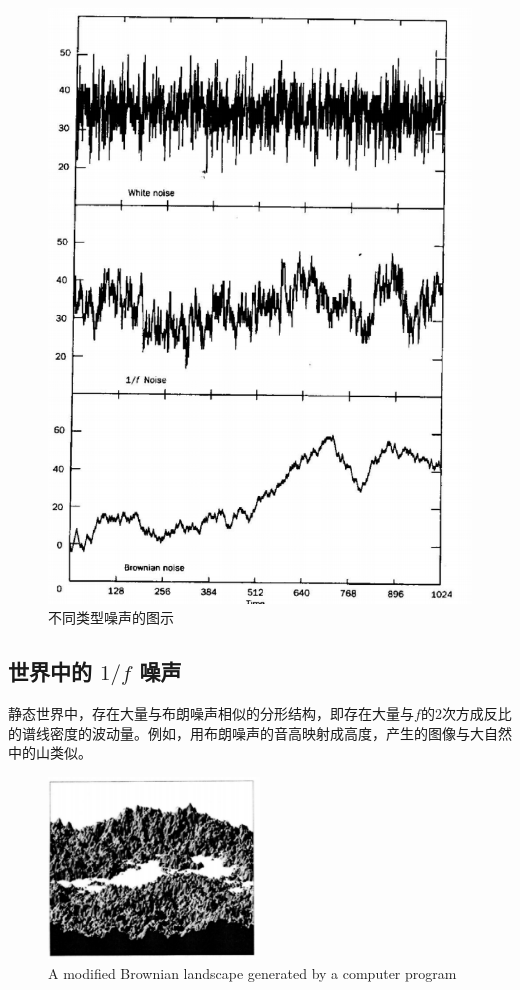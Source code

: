 \documentclass[11pt]{article}
\begin{document}
\begin{figure}[hptb]
	\centering
	\label{fig:1.2.1}
	\includegraphics[width=\textwidth]{pic/1.2.1.eps}
	\caption{不同类型噪声的图示}
\end{figure}

\subsection{世界中的 $1/f$ 噪声}
静态世界中，存在大量与布朗噪声相似的分形结构，即存在大量与$f$的$2$次方成反比的谱线密度的波动量。例如，用布朗噪声的音高映射成高度，产生的图像与大自然中的山类似。

\begin{figure}[hptb]
	\centering
	\label{fig:1.2.2}
	\includegraphics[width=0.5\textwidth]{pic/1.2.2.eps}
	\caption{A modified Brownian landscape generated by a computer program}
\end{figure}
\end{document}
